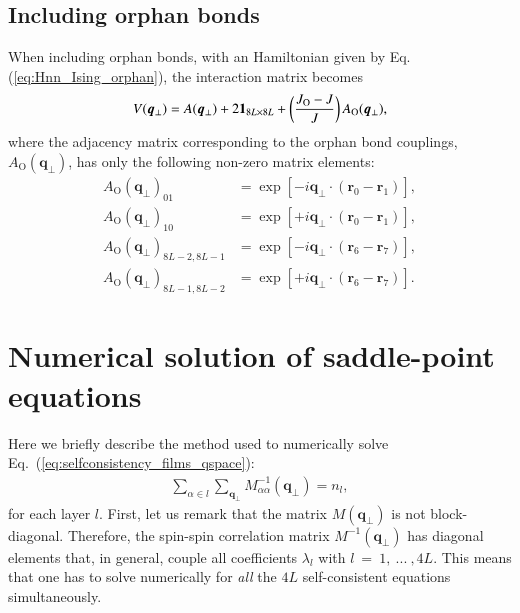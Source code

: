 \documentclass[aps,prx,reprint,runinaddress,superscriptaddress,amsmath,amssymb,floatfix,longbibliography]{revtex4-1}
\renewcommand{\vec}[1]{\boldsymbol{#1}}
\newcommand{\mat}[1]{#1}
\newcommand{\Jo}{J_{\rm O}}
\newcommand{\matone}{\vec{1}}
\begin{document}
\subsection{Including orphan bonds}

When including orphan bonds, with an Hamiltonian given by Eq. (\ref{eq:Hnn_Ising_orphan}), the interaction matrix becomes
\begin{equation}
	\mat{V}(\vec{q}_\perp) = \mat{A}(\vec{q}_\perp)  + 2\matone_{8 L \times 8 L} + \left(\frac{\Jo - J}{J}\right) \mat{A}_\text{O}(\vec{q}_\perp),
\end{equation}
where the adjacency matrix corresponding to the orphan bond couplings, $\mat{A}_\text{O}(\vec{q}_\perp)$, has only the following non-zero matrix elements:
\begin{align}
    \mat{A}_\text{O}(\vec{q}_\perp)_{01} &=  \exp [-i \vec{q}_\perp \cdot ( \vec{r}_0 - \vec{r}_1) ], \nonumber\\
        \mat{A}_\text{O}(\vec{q}_\perp)_{10} &=  \exp [+i \vec{q}_\perp \cdot ( \vec{r}_0 - \vec{r}_1) ] \nonumber,\\ 
    \mat{A}_\text{O}(\vec{q}_\perp)_{8L-2, 8L-1} &=  \exp [ -i \vec{q}_\perp \cdot ( \vec{r}_6 - \vec{r}_7)], \nonumber\\
    \mat{A}_\text{O}(\vec{q}_\perp)_{8L-1, 8L-2} &=  \exp [+ i \vec{q}_\perp \cdot ( \vec{r}_6 - \vec{r}_7)].
\end{align}

\section{Numerical solution of saddle-point equations} 
\label{app:numerics}

Here we briefly describe the method used to numerically solve Eq.~(\ref{eq:selfconsistency_films_qspace}):
\begin{align}
\sum_{\alpha \in l} \sum_{\vec{q}_\perp}  M^{-1}_{\alpha \alpha}({\vec{q}}_\perp) = n_l,
\end{align}
for each layer $l$. First, let us remark that the matrix $\mat{M}(\vec{q}_\perp)$ is not block-diagonal. Therefore, the spin-spin correlation matrix $\mat{M}^{-1}(\vec{q}_\perp)$ has diagonal elements that, in general, couple all coefficients $\lambda_l$ with $l~=~1, \: ... \: , 4L$. This means that one has to solve numerically for \emph{all} the $4L$ self-consistent equations simultaneously. 
\end{document}
